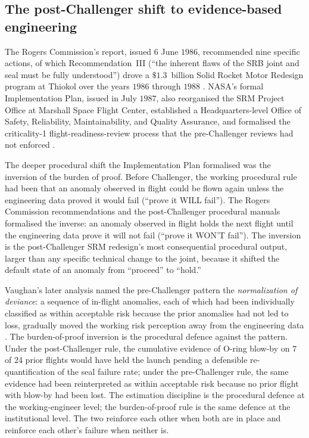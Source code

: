 \subsection{The post-Challenger shift to evidence-based
engineering}

The Rogers Commission's report, issued $6$ June $1986$,
recommended nine specific actions, of which Recommendation~III
(``the inherent flaws of the SRB joint and seal must be
fully understood'') drove a $\$1.3$~billion Solid Rocket Motor
Redesign program at Thiokol over the years $1986$ through
$1988$ \cite{paper:ch09t3-rogers-implementation-1987}. NASA's
formal Implementation Plan, issued in July $1987$, also
reorganised the SRM Project Office at Marshall Space Flight
Center, established a Headquarters-level Office of Safety,
Reliability, Maintainability, and Quality Assurance, and
formalised the criticality-1 flight-readiness-review process
that the pre-Challenger reviews had not enforced
\cite{paper:ch09t3-rogers-implementation-1987}.

The deeper procedural shift the Implementation Plan formalised
was the inversion of the burden of proof. Before Challenger,
the working procedural rule had been that an anomaly observed
in flight could be flown again unless the engineering data
proved it would fail (``prove it WILL fail''). The Rogers
Commission recommendations and the post-Challenger procedural
manuals formalised the inverse: an anomaly observed in flight
holds the next flight until the engineering data prove it
will not fail (``prove it WON'T fail''). The inversion is the
post-Challenger SRM redesign's most consequential procedural
output, larger than any specific technical change to the
joint, because it shifted the default state of an anomaly
from ``proceed'' to ``hold.''

Vaughan's later analysis named the pre-Challenger pattern the
\emph{normalization of deviance}: a sequence of in-flight
anomalies, each of which had been individually classified as
within acceptable risk because the prior anomalies had not led
to loss, gradually moved the working risk perception away from
the engineering data \cite{hist:vaughan1996}. The
burden-of-proof inversion is the procedural defence against
the pattern. Under the post-Challenger rule, the cumulative
evidence of O-ring blow-by on $7$ of $24$ prior flights would
have held the launch pending a defensible re-quantification of
the seal failure rate; under the pre-Challenger rule, the
same evidence had been reinterpreted as within acceptable
risk because no prior flight with blow-by had been lost. The
estimation discipline is the procedural defence at the
working-engineer level; the burden-of-proof rule is the same
defence at the institutional level. The two reinforce each
other when both are in place and reinforce each other's
failure when neither is.

